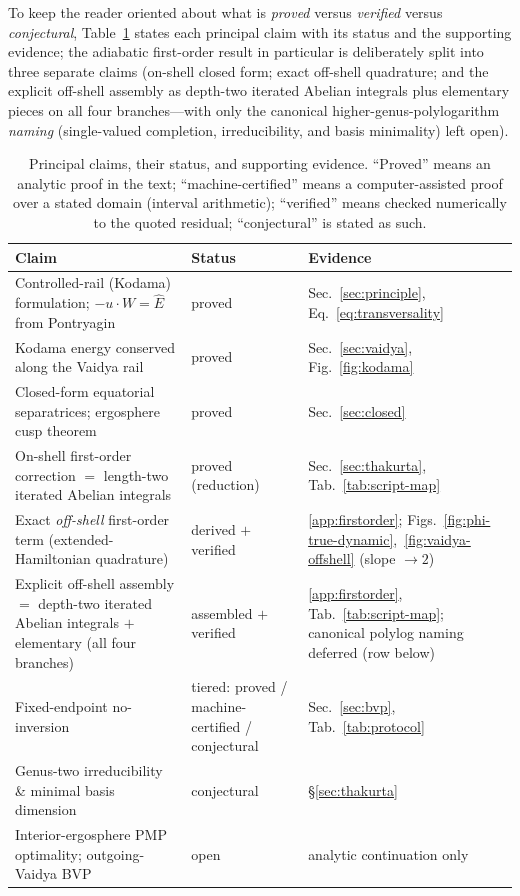 \documentclass[12pt]{iopart}
\newcommand{\Ehat}{\hat E}
\begin{document}
To keep the reader oriented about what is \emph{proved} versus \emph{verified}
versus \emph{conjectural}, Table~\ref{tab:claims} states each principal claim with
its status and the supporting evidence; the adiabatic first-order result in
particular is deliberately split into three separate claims (on-shell closed form;
exact off-shell quadrature; and the explicit off-shell assembly as depth-two
iterated Abelian integrals plus elementary pieces on all four branches---with only
the canonical higher-genus-polylogarithm \emph{naming} (single-valued completion,
irreducibility, and basis minimality) left open).

\begin{table}[htbp]
    \centering
    \caption{Principal claims, their status, and supporting evidence. ``Proved''
    means an analytic proof in the text; ``machine-certified'' means a
    computer-assisted proof over a stated domain (interval arithmetic);
    ``verified'' means checked numerically to the quoted residual; ``conjectural''
    is stated as such.}
    \label{tab:claims}
    \small
    \begin{tabular}{p{}p{}p{}}
        \hline\hline
        Claim & Status & Evidence\\
        \hline
        Controlled-rail (Kodama) formulation; $-u\cdot W=\Ehat$ from Pontryagin
            & proved & Sec.~\ref{sec:principle}, Eq.~\eqref{eq:transversality}\\
        Kodama energy conserved along the Vaidya rail
            & proved & Sec.~\ref{sec:vaidya}, Fig.~\ref{fig:kodama}\\
        Closed-form equatorial separatrices; ergosphere cusp theorem
            & proved & Sec.~\ref{sec:closed}\\
        On-shell first-order correction $=$ length-two iterated Abelian integrals
            & proved (reduction) & Sec.~\ref{sec:thakurta}, Tab.~\ref{tab:script-map}\\
        Exact \emph{off-shell} first-order term (extended-Hamiltonian quadrature)
            & derived $+$ verified & \ref{app:firstorder};
              Figs.~\ref{fig:phi-true-dynamic},~\ref{fig:vaidya-offshell}
              (slope $\to2$)\\
        Explicit off-shell assembly $=$ depth-two iterated Abelian integrals
        $+$ elementary (all four branches)
            & assembled $+$ verified & \ref{app:firstorder},
              Tab.~\ref{tab:script-map}; canonical polylog naming deferred
              (row below)\\
        Fixed-endpoint no-inversion
            & tiered: proved / machine-certified / conjectural
            & Sec.~\ref{sec:bvp}, Tab.~\ref{tab:protocol}\\
        Genus-two irreducibility \& minimal basis dimension
            & conjectural & \S\ref{sec:thakurta}\\
        Interior-ergosphere PMP optimality; outgoing-Vaidya BVP
            & open & analytic continuation only\\
        \hline\hline
    \end{tabular}
\end{table}
\end{document}
